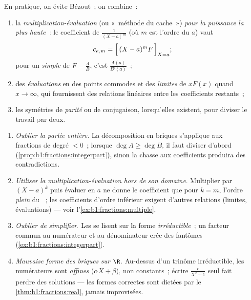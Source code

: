 \begin{method}\label{met:b1:fractions:compute}
En pratique, on évite Bézout~; on combine~:
\begin{enumerate}
  \item la \emph{multiplication-évaluation} (ou «~méthode du cache~»)
        \emph{pour la puissance la plus
        haute}~: le coefficient de $\frac{1}{(X-a)^m}$ (où $m$ est
        l'ordre du  $a$) vaut
        \[
        c_{a,m} = \Bigl[\,(X - a)^m F\,\Bigr]_{X = a};
        \]
        pour un  \emph{simple} de $F = \frac AB$, c'est
        $\frac{A(a)}{B'(a)}$~;
  \item des \emph{évaluations} en des points commodes et des
        \emph{limites} de $xF(x)$ quand $x \to \infty$, qui fournissent
        des relations linéaires entre les coefficients restants~;
  \item les symétries de \emph{parité} ou de conjugaison, lorsqu'elles
        existent, pour diviser le travail par deux.
\end{enumerate}
\end{method}

\begin{remark}\label{rem:b1:fractions:pitfalls}
\begin{enumerate}
  \item \emph{Oublier la partie entière.} La décomposition en briques
        s'applique aux fractions de degré $< 0$~; lorsque $\deg A \geq
        \deg B$, il faut diviser d'abord
        (\cref{prop:b1:fractions:integerpart}), sinon la chasse aux
        coefficients produira des contradictions.
  \item \emph{Utiliser la multiplication-évaluation hors de son
        domaine.} Multiplier par $(X - a)^k$ puis évaluer en $a$ ne
        donne le coefficient que pour $k = m$, l'ordre \emph{plein} du
        ~; les coefficients d'ordre inférieur exigent d'autres
        relations (limites, évaluations) --- voir
        l'\cref{ex:b1:fractions:multiple}.
  \item \emph{Oublier de simplifier.} Les  se lisent sur la forme
        \emph{irréductible}~; un facteur commun au numérateur et au
        dénominateur crée des  fantômes
        (\cref{ex:b1:fractions:integerpart}).
  \item \emph{Mauvaise forme des briques sur $\R$.} Au-dessus d'un
        trinôme irréductible, les numérateurs sont \emph{affines}
        ($\alpha X + \beta$), non constants~; écrire $\frac{c}{X^2 + 1}$
        seul fait perdre des solutions --- les formes correctes sont
        dictées par le \cref{thm:b1:fractions:real}, jamais improvisées.
\end{enumerate}
\end{remark}

